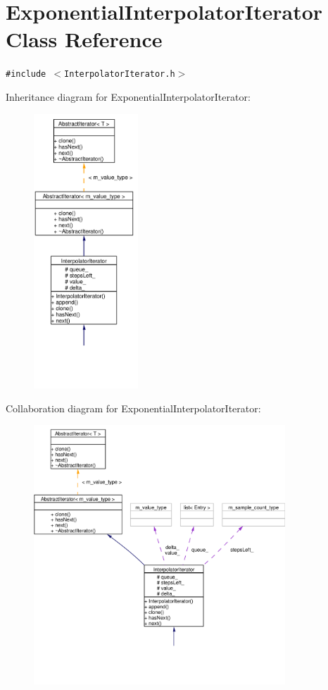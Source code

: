 \hypertarget{classExponentialInterpolatorIterator}{
\section{Exponential\-Interpolator\-Iterator Class Reference}
\label{classExponentialInterpolatorIterator}
}
{\tt \#include $<$Interpolator\-Iterator.h$>$}

Inheritance diagram for Exponential\-Interpolator\-Iterator:\begin{figure}[H]
\begin{center}
\leavevmode
\includegraphics[width=111pt]{classExponentialInterpolatorIterator__inherit__graph}
\end{center}
\end{figure}
Collaboration diagram for Exponential\-Interpolator\-Iterator:\begin{figure}[H]
\begin{center}
\leavevmode
\includegraphics[width=268pt]{classExponentialInterpolatorIterator__coll__graph}
\end{center}
\end{figure}
